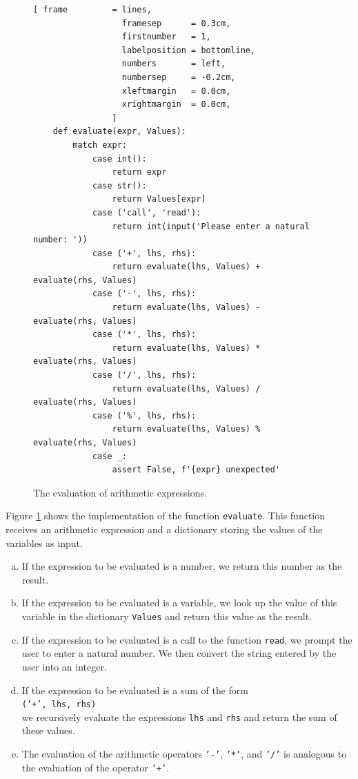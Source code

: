 \begin{figure}[!ht]
\centering
\begin{Verbatim}[ frame         = lines, 
                  framesep      = 0.3cm, 
                  firstnumber   = 1,
                  labelposition = bottomline,
                  numbers       = left,
                  numbersep     = -0.2cm,
                  xleftmargin   = 0.0cm,
                  xrightmargin  = 0.0cm,
                ]
    def evaluate(expr, Values):
        match expr:
            case int():
                return expr
            case str():
                return Values[expr] 
            case ('call', 'read'):
                return int(input('Please enter a natural number: '))
            case ('+', lhs, rhs):
                return evaluate(lhs, Values) + evaluate(rhs, Values)
            case ('-', lhs, rhs):
                return evaluate(lhs, Values) - evaluate(rhs, Values)
            case ('*', lhs, rhs):
                return evaluate(lhs, Values) * evaluate(rhs, Values)
            case ('/', lhs, rhs):
                return evaluate(lhs, Values) / evaluate(rhs, Values)
            case ('%', lhs, rhs):
                return evaluate(lhs, Values) % evaluate(rhs, Values)
            case _:
                assert False, f'{expr} unexpected'
\end{Verbatim}
\vspace*{-0.3cm}
\caption{The evaluation of arithmetic expressions.}
\label{fig:Interpreter.ipynb:evaluate}
\end{figure}

Figure \ref{fig:Interpreter.ipynb:evaluate} shows the implementation of the function \texttt{evaluate}.
This function receives an arithmetic expression and a dictionary storing the
values of the variables as input.
\begin{enumerate}[(a)]
\item If the expression to be evaluated is a number, we return this number as the result.
\item If the expression to be evaluated is a variable, we look up the value of this
      variable in the dictionary \texttt{Values} and return this value as the result.
\item If the expression to be evaluated is a call to the function \texttt{read},
      we prompt the user to enter a natural number. We then convert the string entered by the user into an integer.
\item If the expression to be evaluated is a sum of the form
      \\[0.2cm]
      \hspace*{1.3cm}
      \texttt{('+', lhs, rhs)}
      \\[0.2cm]
      we recursively evaluate the expressions \texttt{lhs} and \texttt{rhs} and return the sum of these
      values. 
\item The evaluation of the arithmetic operators \texttt{'-'}, \texttt{'*'}, and \texttt{'/'}
      is analogous to the evaluation of the operator \texttt{'+'}.
\end{enumerate}
\FloatBarrier

